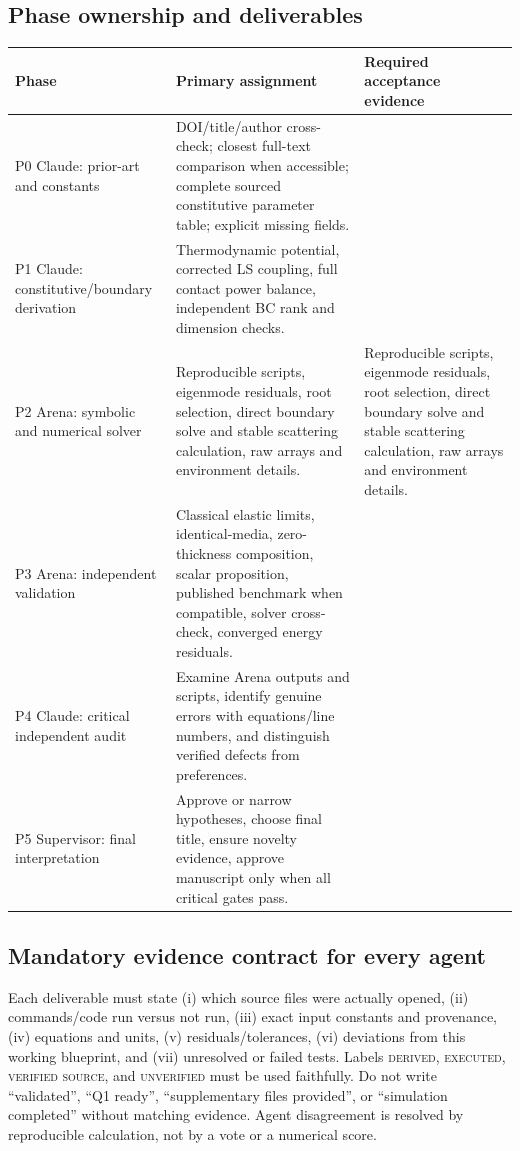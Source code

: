 \documentclass[11pt]{article}
\begin{document}
\subsection*{Phase ownership and deliverables}
\begin{center}
\begin{tabular}{@{}p{}p{}p{}@{}}
\toprule
\textbf{Phase} & \textbf{Primary assignment} & \textbf{Required acceptance
evidence} \\
\midrule
P0 Claude: prior-art and constants & DOI/title/author cross-check; closest
  full-text comparison when accessible; complete sourced constitutive parameter
  table; explicit missing fields. & \\
P1 Claude: constitutive/boundary derivation & Thermodynamic potential, corrected
  LS coupling, full contact power balance, independent BC rank and dimension
  checks. & \\
P2 Arena: symbolic and numerical solver & Reproducible scripts, eigenmode
  residuals, root selection, direct boundary solve and stable scattering
  calculation, raw arrays and environment details. & Reproducible scripts,
  eigenmode residuals, root selection, direct boundary solve and stable
  scattering calculation, raw arrays and environment details. \\
P3 Arena: independent validation & Classical elastic limits, identical-media,
  zero-thickness composition, scalar proposition, published benchmark when
  compatible, solver cross-check, converged energy residuals. & \\
P4 Claude: critical independent audit & Examine Arena outputs and scripts,
  identify genuine errors with equations/line numbers, and distinguish verified
  defects from preferences. & \\
P5 Supervisor: final interpretation & Approve or narrow hypotheses, choose final
  title, ensure novelty evidence, approve manuscript only when all critical gates
  pass. & \\
\bottomrule
\end{tabular}
\end{center}

\subsection*{Mandatory evidence contract for every agent}
Each deliverable must state (i) which source files were actually opened,
(ii) commands/code run versus not run, (iii) exact input constants and provenance,
(iv) equations and units, (v) residuals/tolerances, (vi) deviations from this
working blueprint, and (vii) unresolved or failed tests. Labels \textsc{derived},
\textsc{executed}, \textsc{verified source}, and \textsc{unverified} must be used
faithfully. Do not write ``validated'', ``Q1 ready'', ``supplementary files
provided'', or ``simulation completed'' without matching evidence. Agent
disagreement is resolved by reproducible calculation, not by a vote or a numerical
score.
\end{document}
